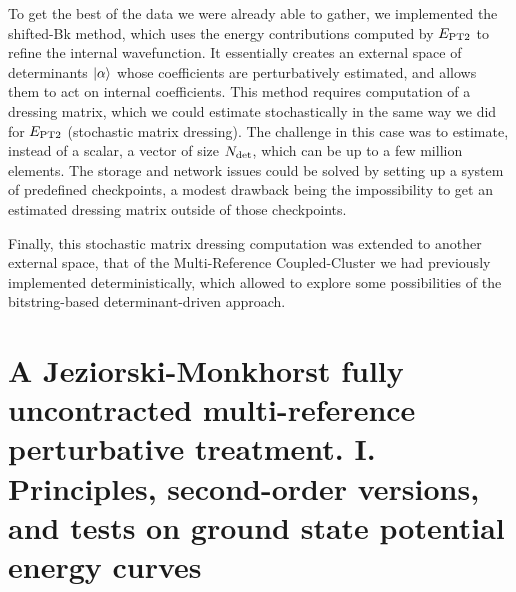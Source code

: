 \documentclass[12pt,a4paper]{report}
\begin{document}
To get the best of the data we were already able to gather, we implemented the shifted-Bk method, which uses the energy contributions computed by $E_\text{PT2}$ to refine the internal wavefunction. It essentially creates an external space of determinants ${\ket{\alpha}}$ whose coefficients are perturbatively estimated, and allows them to act on internal coefficients. This method requires computation of a dressing matrix, which we could estimate stochastically in the same way we did for $E_\text{PT2}$ (stochastic matrix dressing).
The challenge in this case was to estimate, instead of a scalar, a vector of size ${N_\text{det}}$, which can be up to a few million elements. The storage and network issues could be solved by setting up a system of predefined checkpoints, a modest drawback being the impossibility to get an estimated dressing matrix outside of those checkpoints.

Finally, this stochastic matrix dressing computation was extended to another external space, that of the Multi-Reference Coupled-Cluster we had previously implemented deterministically,\cite{Garniron_2017} which allowed to explore some possibilities of the bitstring-based determinant-driven approach.




\appendix

\chapter{A Jeziorski-Monkhorst fully uncontracted multi-reference perturbative treatment. I. Principles, second-order versions, and tests on ground state potential energy curves \cite{Giner_2017}}





%
\end{document}
